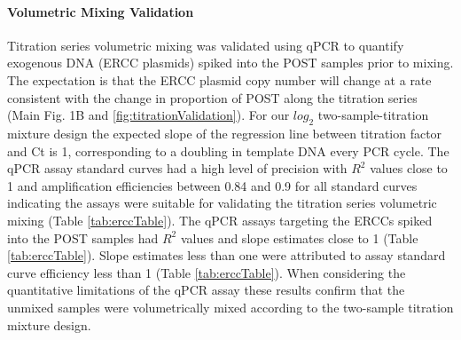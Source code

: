 \documentclass[12pt]{article}
\begin{document}
\paragraph*{Volumetric Mixing Validation}
Titration series volumetric mixing was validated using qPCR to quantify exogenous
DNA (ERCC plasmids) spiked into the POST samples prior to mixing.
The expectation is that the ERCC plasmid copy number will change at a rate consistent
with the change in proportion of POST along the titration series
(Main Fig. 1B and \ref{fig:titrationValidation}).
For our \(log_2\) two-sample-titration mixture design the expected slope of the
regression line between titration factor and Ct is 1, corresponding to a
doubling in template DNA every PCR cycle. The qPCR assay
standard curves had a high level of precision with \(R^2\) values close
to 1 and amplification efficiencies between 0.84 and 0.9 for all
standard curves indicating the assays were suitable for validating the
titration series volumetric mixing (Table \ref{tab:erccTable}). The qPCR assays targeting the
ERCCs spiked into the POST samples had \(R^2\) values and slope
estimates close to 1 (Table \ref{tab:erccTable}). Slope estimates less
than one were attributed to assay standard curve efficiency less than 1
(Table \ref{tab:erccTable}). When considering the
quantitative limitations of the qPCR assay these results confirm that
the unmixed samples were volumetrically mixed according to the
two-sample titration mixture design.

\begin{table}

\caption{\label{tab:erccTable}ERCC Spike-in qPCR assay information and summary statistics.
ERCC is the ERCC identifier for the ERCC spike-in, Assay is TaqMan assay, and Length
and GC are the size and GC content of the qPCR amplicon.  The Std. $R^2$ and Efficiency
(E) statistics were computed for the standard curves. $R^2$ and slope for titration qPCR results for the titration series.}
\centering
{}
\end{table}
\end{document}

